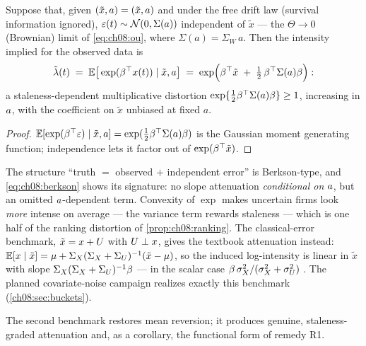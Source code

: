 \begin{proposition}\label{prop:ch08:berkson}
Suppose that, given $(\tilde{x}, a) = (\tilde x, a)$ and under
the free drift law (survival information ignored), $\varepsilon(t) \sim
\mathcal{N}(0, \Sigma(a))$ independent of $\tilde x$ --- the
$\Theta \to 0$ (Brownian) limit of \cref{eq:ch08:ou}, where $\Sigma(a) =
\Sigma_W\, a$. Then the intensity implied for the observed data is
\begin{equation}\label{eq:ch08:berkson}
\tilde{\lambda}(t)
 \;=\;
 \mathbb{E}\big[\exp(\beta^{\top}x(t)) \mid \tilde x, a\big]
 \;=\;
 \exp\!\Big(\beta^{\top}\tilde x \;+\; \tfrac12\,\beta^{\top}\Sigma(a)\beta\Big):
\end{equation}
a staleness-dependent multiplicative distortion
$\exp\{\tfrac12\beta^{\top}\Sigma(a)\beta\} \ge 1$, increasing in
$a$, with the coefficient on $\tilde x$ unbiased at fixed $a$.
\end{proposition}

\begin{proof}
$\mathbb{E}[\exp(\beta^{\top}\varepsilon) \mid \tilde x, a] =
\exp(\tfrac12\beta^{\top}\Sigma(a)\beta)$ is the Gaussian moment generating
function; independence lets it factor out of
$\exp(\beta^{\top}\tilde x)$.
\end{proof}

\begin{remark}
The structure ``truth $=$ observed $+$ independent error'' is
Berkson-type, and \cref{eq:ch08:berkson} shows its signature: no slope
attenuation \emph{conditional on} $a$, but an omitted
$a$-dependent term. Convexity of $\exp$ makes uncertain firms
look \emph{more} intense on average --- the variance term rewards
staleness --- which is one half of the ranking distortion of
\cref{prop:ch08:ranking}. The classical-error benchmark, $\tilde x =
x + U$ with $U \perp x$, gives the textbook attenuation instead:
$\mathbb{E}[x \mid \tilde x] = \mu + \Sigma_X(\Sigma_X + \Sigma_U)^{-1}(\tilde
x - \mu)$, so the induced log-intensity is linear in $\tilde x$ with
slope $\Sigma_X(\Sigma_X+\Sigma_U)^{-1}\beta$ --- in the scalar case
$\beta\,\sigma_X^2/(\sigma_X^2+\sigma_U^2)$
\citep{prentice1982,carroll2006}. The planned covariate-noise campaign
realizes exactly this benchmark (\cref{ch08:sec:buckets}).
\end{remark}

The second benchmark restores mean reversion; it produces genuine,
staleness-graded attenuation and, as a corollary, the functional form of
remedy R1.

